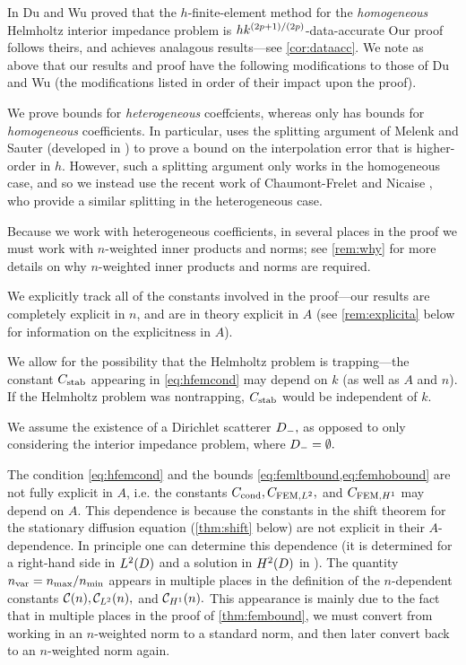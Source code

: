In \cite{DuWu:15} Du and Wu proved that the $h$-finite-element method for the \emph{homogeneous} Helmholtz interior impedance problem is $hk^{(2p+1)/(2p)}$-data-accurate  Our proof follows theirs, and achieves analagous results---see \cref{cor:dataacc}. We note as above that our results and proof have the following modifications to those of Du and Wu (the modifications listed in order of their impact upon the proof).
\ben
\item We prove bounds for \emph{heterogeneous} coeffcients, whereas \cite{DuWu:15} only has bounds for \emph{homogeneous}  coefficients. In particular, \cite{DuWu:15} uses the splitting argument of Melenk and Sauter (developed in \cite{MeSa:10,MeSa:11}) to prove a bound on the interpolation error that is higher-order in $h$. However, such a splitting argument only works in the homogeneous case, and so we instead use the recent work of Chaumont-Frelet and Nicaise \cite{ChNi:19}, who provide a similar splitting in the heterogeneous case.
\item  Because we work with heterogeneous coefficients, in several places in the proof we must work with $n$-weighted inner products and norms; see \cref{rem:why} for more details on why $n$-weighted inner products and norms are required.
\item We explicitly track all of the constants involved in the proof---our results are completely explicit in $n$, and are in theory explicit in $A$ (see \cref{rem:explicita} below for information on the explicitness in $A$).
\item We allow for the possibility that the Helmholtz problem is trapping---the constant $C_{\mathrm{stab}}$ appearing in \cref{eq:hfemcond} may depend on $k$ (as well as $A$ and $n$). If the Helmholtz problem was nontrapping, $C_{\mathrm{stab}}$ would be independent of $k$.
  \item We assume the existence of a Dirichlet scatterer $D_{-},$ as opposed to only considering the interior impedance problem, where $D_{-}=\emptyset.$
\een
\ere

\label{rem:explicita}
The condition \cref{eq:hfemcond} and the bounds \cref{eq:femltbound,eq:femhobound} are not fully explicit in $A$, i.e. the constants $C_{\mathrm{cond}}, C_{\mathrm{FEM},L^{2}},$ and $C_{\mathrm{FEM},H^{1}}$ may depend on $A$. This dependence is because the constants in the shift theorem for the stationary diffusion equation (\cref{thm:shift} below) are not explicit in their $A$-dependence. In principle one can determine this dependence (it is determined for a right-hand side in $\LtD$ and a solution in $\HtD$ in \cite[Appendix A]{ChScTe:13}).
\ere
{}\label{rem:nvar}
The quantity $n_{\mathrm{var}} = n_{\max}/n_{\min}$ appears in multiple places in the definition of the $n$-dependent constants $\mathcal C(n), \mathcal C_{L^{2}}(n),$ and $\mathcal C_{H^{1}}(n).$ This appearance is mainly due to the fact that in multiple places in the proof of \cref{thm:fembound}, we must convert from working in an $n$-weighted norm to a standard norm, and then later convert back to an $n$-weighted norm again.

